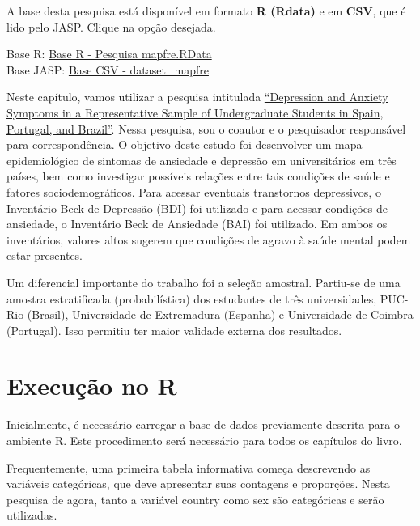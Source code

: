 \documentclass[
]{book}
\newenvironment{base}{
  \definecolor{shadecolor}{rgb}{0.972,0.972,0.972}  %
  \color{black}
  \begin{shaded}}
 {\end{shaded}}
\begin{document}
\begin{base}
A base desta pesquisa está disponível em formato \textbf{R (Rdata)} e em \textbf{CSV}, que é lido pelo JASP. Clique na opção desejada.

Base R: \href{https://github.com/anovabr/mqt/raw/master/bases/Base\%20R\%20-\%20Pesquisa\%20mapfre.RData}{Base R - Pesquisa mapfre.RData}\\
Base JASP: \href{https://github.com/anovabr/mqt/raw/master/bases/bases_csv_jasp.zip}{Base CSV - dataset\_mapfre}

\end{base}

Neste capítulo, vamos utilizar a pesquisa intitulada \href{https://doi.org/10.1590/0102.3772e36412}{``Depression and Anxiety Symptoms in a Representative Sample of Undergraduate Students in Spain, Portugal, and Brazil''}. Nessa pesquisa, sou o coautor e o pesquisador responsável para correspondência. O objetivo deste estudo foi desenvolver um mapa epidemiológico de sintomas de ansiedade e depressão em universitários em três países, bem como investigar possíveis relações entre tais condições de saúde e fatores sociodemográficos. Para acessar eventuais transtornos depressivos, o Inventário Beck de Depressão (BDI) foi utilizado e para acessar condições de ansiedade, o Inventário Beck de Ansiedade (BAI) foi utilizado. Em ambos os inventários, valores altos sugerem que condições de agravo à saúde mental podem estar presentes.

Um diferencial importante do trabalho foi a seleção amostral. Partiu-se de uma amostra estratificada (probabilística) dos estudantes de três universidades, PUC-Rio (Brasil), Universidade de Extremadura (Espanha) e Universidade de Coimbra (Portugal). Isso permitiu ter maior validade externa dos resultados.

\hypertarget{execuuxe7uxe3o-no-r}{%
\section{Execução no R}\label{execuuxe7uxe3o-no-r}}

Inicialmente, é necessário carregar a base de dados previamente descrita para o ambiente R. Este procedimento será necessário para todos os capítulos do livro.

Frequentemente, uma primeira tabela informativa começa descrevendo as variáveis categóricas, que deve apresentar suas contagens e proporções. Nesta pesquisa de agora, tanto a variável country como sex são categóricas e serão utilizadas.
\end{document}
